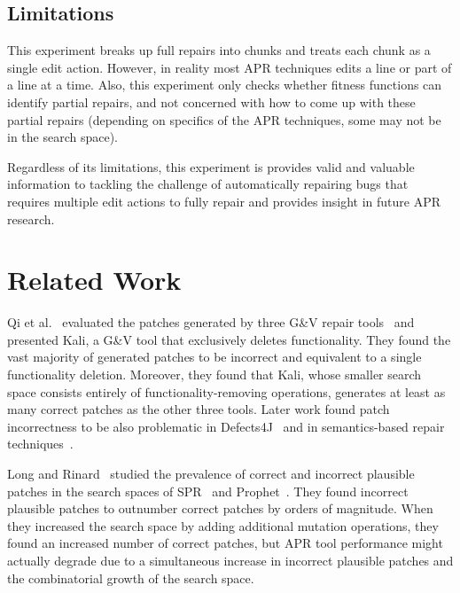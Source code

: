 \documentclass[sigconf, timestamp-false, anonymous=true]{acmart}
\begin{document}
\subsection{Limitations}

This experiment breaks up full repairs into chunks and treats each chunk as a 
single edit action. However, in reality most APR techniques edits a line or part 
of a line at a time. Also, this experiment only checks whether fitness functions 
can identify partial repairs, and not concerned with how to come up with these 
partial repairs (depending on specifics of the APR 
techniques, some may not be in the search space).

Regardless of its limitations, this experiment is provides valid and valuable 
information to tackling the challenge of automatically repairing bugs that 
requires multiple edit actions to fully repair 
and provides insight in future APR research.


\section{Related Work}

Qi et al.~\cite{patch-correctness} evaluated the patches generated 
by three G\&V repair tools~\cite{genprog, ae, rsrepair} and presented 
Kali, a G\&V tool that exclusively deletes functionality. They found the 
vast majority of generated patches to be incorrect and equivalent to 
a single functionality deletion. Moreover, they found that Kali, whose 
smaller search space consists entirely of functionality-removing 
operations, generates at least as many correct patches as the 
other three tools. Later work found patch incorrectness to be 
also problematic in Defects4J~\cite{d4j-eval} and in semantics-based 
repair techniques~\cite{Le2018}.

Long and Rinard~\cite{long-search-spaces} studied the prevalence of 
correct and incorrect plausible patches in the search spaces of SPR~\cite{spr} 
and Prophet~\cite{prophet}. They found incorrect plausible patches to outnumber 
correct patches by orders of magnitude. When they increased the search space 
by adding additional mutation operations, they found an increased number of 
correct patches, but APR tool performance might actually degrade due to a 
simultaneous increase in incorrect plausible patches and the combinatorial 
growth of the search space.
\end{document}
